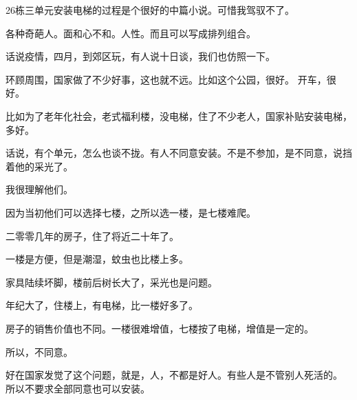 \documentclass{article}   %
\begin{document}
	26栋三单元安装电梯的过程是个很好的中篇小说。可惜我驾驭不了。
	
各种奇葩人。面和心不和。人性。而且可以写成排列组合。

话说疫情，四月，到郊区玩，有人说十日谈，我们也仿照一下。

环顾周围，国家做了不少好事，这也就不远。比如这个公园，很好。
开车，很好。

比如为了老年化社会，老式福利楼，没电梯，住了不少老人，国家补贴安装电梯，多好。

话说，有个单元，怎么也谈不拢。有人不同意安装。不是不参加，是不同意，说挡着他的采光了。

我很理解他们。

因为当初他们可以选择七楼，之所以选一楼，是七楼难爬。

二零零几年的房子，住了将近二十年了。

一楼是方便，但是潮湿，蚊虫也比楼上多。

家具陆续坏脚，楼前后树长大了，采光也是问题。

年纪大了，住楼上，有电梯，比一楼好多了。

房子的销售价值也不同。一楼很难增值，七楼按了电梯，增值是一定的。

所以，不同意。

好在国家发觉了这个问题，就是，人，不都是好人。有些人是不管别人死活的。
所以不要求全部同意也可以安装。
\end{document}

